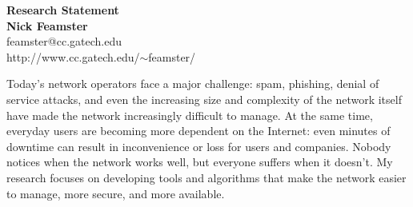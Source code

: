 
\newpage \setcounter{page}{1}

\begin{center}

{\Large\textbf{Research Statement}}\\[.1in] {\large\textbf{Nick
Feamster}}\\[.05in] feamster@cc.gatech.edu \\
http://www.cc.gatech.edu/$\sim$feamster/ \\[.1in] \end{center}



Today's network operators face a major challenge: spam, phishing, denial
of service attacks, and even the increasing size and complexity of the
network itself have made the network increasingly difficult to
manage. At the same time, everyday users are becoming more dependent on
the Internet: even minutes of downtime can result in inconvenience or
loss for users and companies.  Nobody notices when the network works
well, but everyone suffers when it doesn't.  My research focuses on
developing tools and algorithms that make the network easier to manage,
more secure, and more available.


